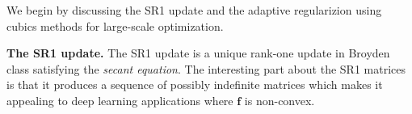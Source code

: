 We begin by discussing the SR1 update and the adaptive regularizion using cubics methods for large-scale optimization.

\noindent\textbf{The SR1 update.} The SR1 update is a unique rank-one update in Broyden class satisfying the \textit{secant equation}. The interesting part about the SR1 matrices is that it produces a sequence of possibly indefinite matrices which makes it appealing to deep learning applications where $\mathbf{f}$ is non-convex.